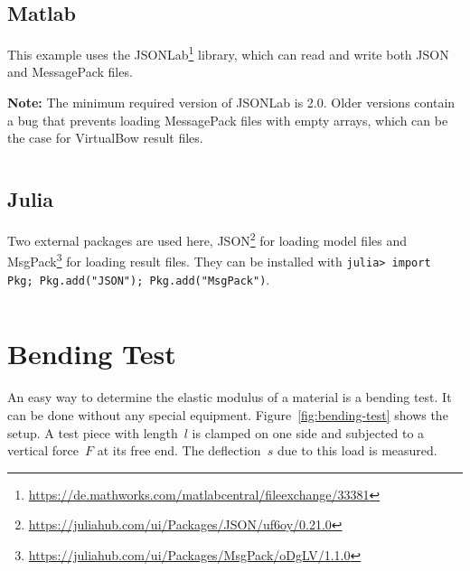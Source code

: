 \documentclass[12pt]{article}
\begin{document}
\bigskip

\begin{framed}
\inputminted{python}{../examples/scripts/python/example.py}
\end{framed}

\subsection{Matlab}

This example uses the JSONLab\footnote{\url{https://de.mathworks.com/matlabcentral/fileexchange/33381}} library, which can read and write both JSON and MessagePack files.

\textbf{Note:} The minimum required version of JSONLab is 2.0. Older versions contain a bug that prevents loading MessagePack files with empty arrays, which can be the case for VirtualBow result files.

\bigskip

\begin{framed}
\inputminted{matlab}{../examples/scripts/matlab/example.m}
\end{framed}

\newpage
\subsection{Julia}

Two external packages are used here, JSON\footnote{\url{https://juliahub.com/ui/Packages/JSON/uf6oy/0.21.0}} for loading model files and MsgPack\footnote{\url{https://juliahub.com/ui/Packages/MsgPack/oDgLV/1.1.0}} for loading result files. They can be installed with \texttt{julia> import Pkg; Pkg.add("JSON"); Pkg.add("MsgPack")}.

\bigskip

\begin{framed}
\inputminted{python}{../examples/scripts/julia/example.jl}
\end{framed}

\newpage
\section{Bending Test}
\label{sec:bending-test}

An easy way to determine the elastic modulus of a material is a bending test.
It can be done without any special equipment.
Figure~\ref{fig:bending-test} shows the setup.
A test piece with length~$l$ is clamped on one side and subjected to a vertical force~$F$ at its free end.
The deflection~$s$ due to this load is measured.
\end{document}
